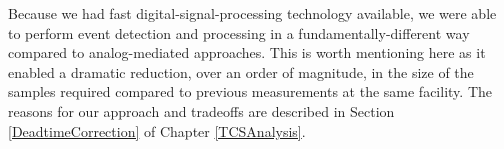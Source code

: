 Because we had fast digital-signal-processing technology available, we were able
to perform event detection and processing in a fundamentally-different way
compared to analog-mediated approaches. This is worth mentioning
here as it enabled a dramatic reduction, over an order of magnitude, in the size of the
samples required compared to previous measurements at the same facility. The reasons
for our approach and tradeoffs are
described in Section \ref{DeadtimeCorrection} of Chapter \ref{TCSAnalysis}.

\afterpage{\clearpage}
